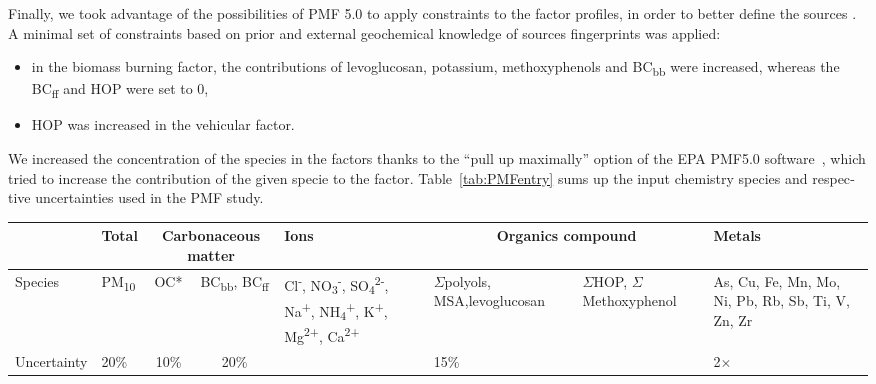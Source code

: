 \begin{otherlanguage}{english}
Finally, we took advantage of the possibilities of PMF 5.0 to apply
constraints to the factor profiles, in order to better define the sources
\parencite{gollyEtude2014,srivastavaSpeciation2017,salamehImpacts2015}.
A minimal set of constraints based on prior and external geochemical knowledge
of sources fingerprints was applied:
\begin{itemize}
    \item
        in the biomass burning factor, the contributions of levoglucosan, potassium,
        methoxyphenols and BC\textsubscript{bb} were increased,
        whereas the BC\textsubscript{ff} and HOP were set to 0,
    \item
        HOP was increased in the vehicular factor.
\end{itemize}
We increased the concentration of the species in the factors thanks to the “pull
up maximally” option of the EPA PMF5.0 software~\parencite{usepaPositive2017},
which tried to increase the contribution of the given specie to the factor.
Table~\ref{tab:PMFentry} sums up the input chemistry species and respective uncertainties
used in the PMF study.
\begin{table*}
    \centering
    \caption{Selection of the chemical species used as input variables in the EPA PMF5.0
        model and their relative uncertainties. $\Sigma$polyols refers to the sum of
        arabitol, sorbitol and mannitol and $\Sigma$methoxyphenol to the sum of the
        particulate methoxyphenols.  The uncertainties in ``\%'' are relative to
        the sample concentration for the species.}
        \scriptsize
    \begin{tabularx}{\textwidth}{Xlccm{2.7cm}m{1.5cm}m{2.6cm}m{3cm}}
        \toprule
        & Total & \multicolumn{2}{c}{Carbonaceous matter} & Ions &
        \multicolumn{2}{c}{Organics compound} & Metals\\
        \midrule
        Species & PM\textsubscript{10} & OC* &
        BC\textsubscript{bb}, BC\textsubscript{ff} & Cl\textsuperscript{-},
        NO\textsubscript{3}\textsuperscript{-},
        SO\textsubscript{4}\textsuperscript{2-}, Na\textsuperscript{+},
        NH\textsubscript{4}\textsuperscript{+}, K\textsuperscript{+},
        Mg\textsuperscript{2+}, Ca\textsuperscript{2+} &
        $\Sigma$polyols, MSA,\newline levoglucosan &
        $\Sigma$HOP, $\Sigma$Methoxyphenol &
        As, Cu, Fe, Mn, Mo, Ni, Pb, Rb, Sb, Ti, V, Zn, Zr
        \\
        Uncertainty & 20\% & 10\% & 20\% & \textcite{gianiniSource2013} & 15\% &
        \textcite{gianiniSource2013} & 2$\times$\textcite{gianiniSource2013} \\
        \bottomrule
    \end{tabularx}
    \label{tab:PMFentry}
\end{table*}



\end{otherlanguage}
